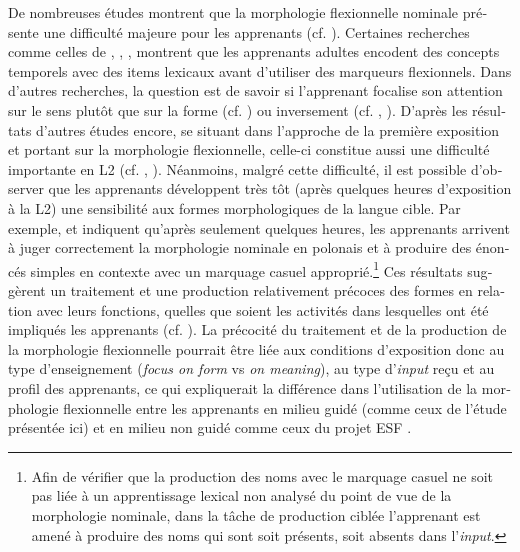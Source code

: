 \documentclass[output=paper]{langscibook}
\begin{document}
\begin{otherlanguage}{french}
De nombreuses études montrent que la morphologie flexionnelle nominale présente une difficulté majeure pour les apprenants (cf. \citealt{Larsen-Freeman2010}). Certaines recherches comme celles de \citet{Bardovi-Harlig1992}, \citet{KleinPerdue1997}, \citet{Starren2001}, montrent que les apprenants adultes encodent des concepts temporels avec des items lexicaux avant d’utiliser des marqueurs flexionnels. Dans d’autres recherches,  la question est de savoir si l’apprenant focalise son attention sur le sens plutôt que sur la forme (cf. \citealt{VanPatten2004Processing}) ou inversement (cf. \citealt{HanPeverly2007}, \citealt{Park2011}). D’après les résultats d’autres études encore, se situant dans l’approche de la première exposition et portant sur la morphologie flexionnelle, celle-ci constitue aussi une difficulté importante en L2 (cf. \citealt{CarrollWidjaja2013}, \citealt{HanLiu2013}). Néanmoins, malgré cette difficulté, il est possible d’observer que les apprenants développent très tôt (après quelques heures d’exposition à la L2) une sensibilité aux formes morphologiques de la langue cible. Par exemple, \citet{HinzEtAl2013} et \citet{RastEtAl2014} indiquent qu’après seulement quelques heures, les apprenants arrivent à juger correctement la morphologie nominale en polonais et à produire des énoncés simples en contexte avec un marquage casuel approprié.\footnote{ Afin de vérifier que la production des noms avec le marquage casuel ne soit pas liée à un apprentissage lexical non analysé du point de vue de la morphologie nominale, dans la tâche de production ciblée l’apprenant est amené à produire des noms qui sont soit présents, soit absents dans l’\textit{input}.} Ces résultats suggèrent un traitement et une production relativement précoces des formes en relation avec leurs fonctions, quelles que soient les activités dans lesquelles ont été impliqués les apprenants (cf. \citealt{WatorekEtAl2016}). La précocité du traitement et de la production de la morphologie flexionnelle pourrait être liée aux conditions d’exposition donc au type d’enseignement (\textit{focus on form} vs \textit{on meaning}), au type d’\textit{input} reçu et au profil des apprenants, ce qui expliquerait la différence dans l’utilisation de la morphologie flexionnelle entre les apprenants en milieu guidé (comme ceux de l’étude présentée ici) et en milieu non guidé comme ceux du projet ESF \citep{Perdue1993}.  


\end{otherlanguage}
\end{document}
